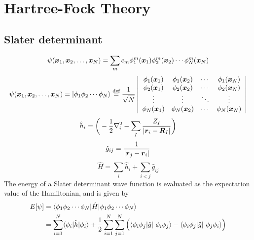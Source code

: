 \section{Hartree-Fock Theory}\label{sec:HFT}
\subsection{Slater determinant}
\begin{equation}
    \psi(\boldsymbol x_1,\boldsymbol x_2,\dots,\boldsymbol x_N) = \sum_m c_m 
	\phi_1^m(\boldsymbol x_1)
	\phi_2^m(\boldsymbol x_2)\cdots
	\phi_N^m(\boldsymbol x_N)
\end{equation}
\begin{equation}
    \begin{split}
    \psi(\boldsymbol x_1,\boldsymbol x_2,\dots,\boldsymbol x_N) = 
    |\phi_1\phi_2\cdots\phi_N\rangle \stackrel{\text{def}}{\hbox{=}} \frac{1}{\sqrt{N}} 
    \left|
    \begin{array}{cccc}
	\phi_1(\boldsymbol x_1)	& \phi_1(\boldsymbol x_2)	& \cdots & \phi_1(\boldsymbol x_N)\\
	\phi_2(\boldsymbol x_1)	& \phi_2(\boldsymbol x_2)	& \cdots & \phi_2(\boldsymbol x_N)\\
	\vdots			& \vdots		& \ddots & \vdots\\
	\phi_N(\boldsymbol x_1)	& \phi_N(\boldsymbol x_2)	& \cdots & \phi_N(\boldsymbol x_N)
    \end{array}
    \right|
    \end{split}
\end{equation}
\begin{equation}
    \hat{h}_i = \bigg(-\frac{1}{2}\nabla_i^2
	-\sum_I \frac{Z_I}{|\boldsymbol r_i-\boldsymbol R_I|}\bigg)
\end{equation}
\begin{equation}
    \hat{g}_{ij} = \frac{1}{|\boldsymbol r_j-\boldsymbol r_i|}
\end{equation}
\begin{equation}
    \hat{H} = \sum_i \hat{h}_i + \sum_{i<j} \hat{g}_{ij}
\end{equation}
The energy of a Slater determinant wave function is evaluated as the expectation value
of the Hamiltonian, and is given by
\begin{align}
    E[\wavefunction] &=
    \langle\orbital_1\orbital_2\cdots\orbital_N|\hat{H}|
    \orbital_1\orbital_2\cdots\orbital_N\rangle\\
    &= \sum_{i=1}^N \langle \orbital_i |\hat{h}| \orbital_i \rangle +
    \frac{1}{2} \sum_{i=1}^N\sum_{j=1}^N \Big(
    \langle \orbital_i\orbital_j |\hat{g}| \orbital_i\orbital_j\rangle -
    \langle \orbital_i\orbital_j |\hat{g}| \orbital_j\orbital_i\rangle\Big)
\end{align}
